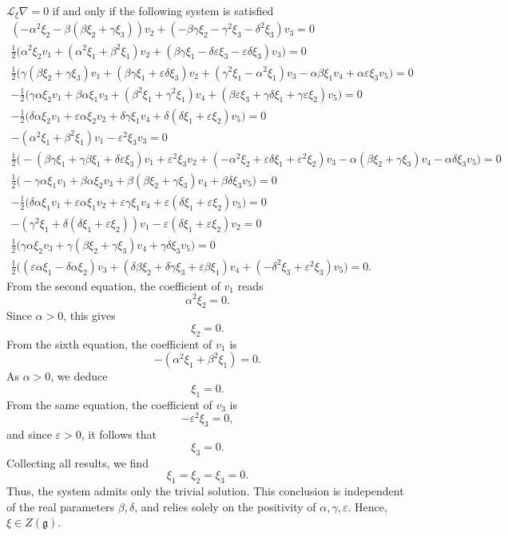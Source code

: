 \documentclass[10pt]{article}
\begin{document}
$\mathscr{L}_\xi\nabla=0$ if and only if the following system is satisfied \begin{eqnarray}
    \left(-\alpha^2\xi_2 - \beta(\beta\xi_2 + \gamma\xi_3)\right)v_2 + \left(-\beta\gamma\xi_2 - \gamma^2\xi_3 - \delta^2\xi_3\right)v_3 =0 \quad\\
 \tfrac{1}{2}\Big(\alpha^2\xi_2v_1 + (\alpha^2\xi_1 + \beta^2\xi_1)v_2 + (\beta\gamma\xi_1 - \delta\varepsilon\xi_3 - \varepsilon\delta\xi_3)v_3\Big) =0 \quad\\
 \tfrac{1}{2}\Big(\gamma(\beta\xi_2 + \gamma\xi_3)v_1 + \left(\beta\gamma\xi_1 + \varepsilon\delta\xi_3\right)v_2  + \left(\gamma^2\xi_1 - \alpha^2\xi_1\right)v_3 - \alpha\beta\xi_1v_4 + \alpha\varepsilon\xi_3v_5\Big) =0 \quad\\
-\tfrac{1}{2}\Big(\gamma\alpha\xi_2v_1 + \beta\alpha\xi_1v_3 + (\beta^2\xi_1 + \gamma^2\xi_1)v_4 + (\beta\varepsilon\xi_3 + \gamma\delta\xi_1 + \gamma\varepsilon\xi_2)v_5\Big) =0\quad \\
 -\tfrac{1}{2}\Big(\delta\alpha\xi_2v_1 + \varepsilon\alpha\xi_2v_2 + \delta\gamma\xi_1v_4 + \delta(\delta\xi_1 + \varepsilon\xi_2)v_5\Big) =0\quad\\
 -(\alpha^2\xi_1 + \beta^2\xi_1)v_1 - \varepsilon^2\xi_3v_3 =0 \quad\\
 \tfrac{1}{2}\Big(-\left(\beta\gamma\xi_1 + \gamma\beta\xi_1 + \delta\varepsilon\xi_3\right)v_1 + \varepsilon^2\xi_3v_2  + (-\alpha^2\xi_2 + \varepsilon\delta\xi_1 + \varepsilon^2\xi_2)v_3 - \alpha(\beta\xi_2 + \gamma\xi_3)v_4 - \alpha\delta\xi_3v_5\Big) =0 \quad\\
 \tfrac{1}{2}\Big(-\gamma\alpha\xi_1v_1 + \beta\alpha\xi_2v_3 + \beta(\beta\xi_2 + \gamma\xi_3)v_4 + \beta\delta\xi_3v_5\Big) =0\quad \\
-\tfrac{1}{2}\Big(\delta\alpha\xi_1v_1 + \varepsilon\alpha\xi_1v_2 + \varepsilon\gamma\xi_1v_4 + \varepsilon(\delta\xi_1 + \varepsilon\xi_2)v_5\Big) =0 \quad\\
 -(\gamma^2\xi_1 + \delta(\delta\xi_1 + \varepsilon\xi_2))v_1 - \varepsilon(\delta\xi_1 + \varepsilon\xi_2)v_2=0 \quad\\
 \tfrac{1}{2}\Big(\gamma\alpha\xi_2v_3 + \gamma(\beta\xi_2 + \gamma\xi_3)v_4 + \gamma\delta\xi_3v_5\Big)=0 \quad\\
\tfrac{1}{2}\Big((\varepsilon\alpha\xi_1 - \delta\alpha\xi_2)v_3 + (\delta\beta\xi_2 + \delta\gamma\xi_3 + \varepsilon\beta\xi_1)v_4  + (-\delta^2\xi_3 + \varepsilon^2\xi_3)v_5\Big)=0.\quad
\end{eqnarray}
From the second equation, the coefficient of \(v_1\) reads
\[
\alpha^2 \xi_2 = 0.
\]
Since \(\alpha>0\), this gives
\[
\xi_2 = 0.
\]
From the sixth equation, the coefficient of \(v_1\) is
\[
-(\alpha^2\xi_1 + \beta^2\xi_1) = 0.
\]
As \(\alpha>0\), we deduce
\[
\xi_1 = 0.
\]
From the same equation, the coefficient of \(v_3\) is
\[
-\varepsilon^2 \xi_3 = 0,
\]
and since \(\varepsilon>0\), it follows that
\[
\xi_3 = 0.
\]
Collecting all results, we find
\[
\xi_1=\xi_2=\xi_3 = 0.
\]
Thus, the system admits only the trivial solution. 
This conclusion is independent of the real parameters \(\beta,\delta\), 
and relies solely on the positivity of \(\alpha,\gamma,\varepsilon\). Hence, $\xi\in Z(\mathfrak{g}).$
\end{document}
